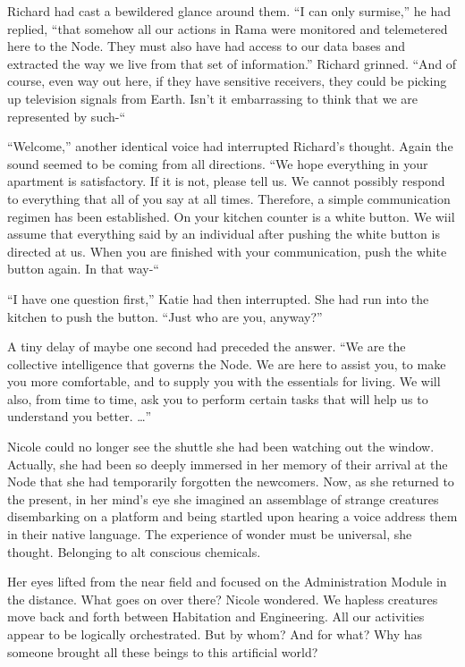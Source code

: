\documentclass[]{article}
\begin{document}
{Richard had cast a bewildered glance around them. “I can only surmise,” he had replied, “that somehow all our actions in Rama were monitored and telemetered here to the Node. They must also have had access to our data bases and extracted the way we live from that set of information.” Richard grinned. “And of course, even way out here, if they have sensitive receivers, they could be picking up television signals from Earth. Isn’t it embarrassing to think that we are represented by such-“

“Welcome,” another identical voice had interrupted Richard’s thought. Again the sound seemed to be coming from all directions. “We hope everything in your apartment is satisfactory. If it is not, please tell us. We cannot possibly respond to everything that all of you say at all times. Therefore, a simple communication regimen has been established. On your kitchen counter is a white button. We wiil assume that everything said by an individual after pushing the white button is directed at us. When you are finished with your communication, push the white button again. In that way-“

“I have one question first,” Katie had then interrupted. She had run into the kitchen to push the button. “Just who are you, anyway?”

A tiny delay of maybe one second had preceded the answer. “We are the collective intelligence that governs the Node. We are here to assist you, to make you more comfortable, and to supply you with the essentials for living. We will also, from time to time, ask you to perform certain tasks that will help us to understand you better. …”

Nicole could no longer see the shuttle she had been watching out the window. Actually, she had been so deeply immersed in her memory of their arrival at the Node that she had temporarily forgotten the newcomers. Now, as she returned to the present, in her mind’s eye she imagined an assemblage of strange creatures disembarking on a platform and being startled upon hearing a voice address them in their native language. The experience of wonder must be universal, she thought. Belonging to alt conscious chemicals.

Her eyes lifted from the near field and focused on the Administration Module in the distance. What goes on over there? Nicole wondered. We hapless creatures move back and forth between Habitation and Engineering. All our activities appear to be logically orchestrated. But by whom? And for what? Why has someone brought all these beings to this artificial world?

}
\end{document}
